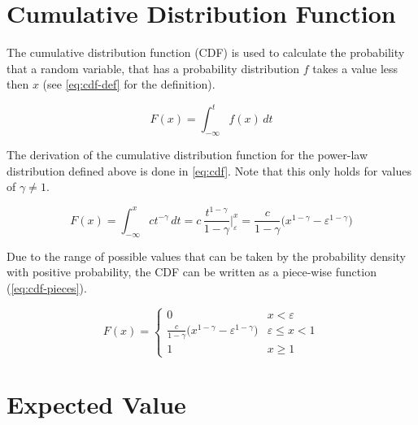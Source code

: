 

\section{Cumulative Distribution Function}
\label{sec:cdf}

The cumulative distribution function (CDF) is used to calculate the probability that a random variable, that has a probability distribution \(f\) takes a value less then \(x\) (see \autoref{eq:cdf-def} for the definition).

\begin{equation}
	F(x) = \int_{-\infty}^{t} f(x) \, dt
	\label{eq:cdf-def}
\end{equation}

The derivation of the cumulative distribution function for the power-law distribution defined above is done in \autoref{eq:cdf}.
Note that this only holds for values of \(\gamma \neq 1\).

\begin{equation}
	F(x) = \int_{-\infty}^{x} ct^{-\gamma} \, dt = c \, \frac{t^{1-\gamma}}{1-\gamma}  \bigg |_{\varepsilon}^{x} = \frac{c}{1-\gamma} \Big( x^{1 - \gamma} - \varepsilon^{1 - \gamma} \Big)
	\label{eq:cdf}
\end{equation}

Due to the range of possible values that can be taken by the probability density with positive probability, the CDF can be written as a piece-wise function (\autoref{eq:cdf-pieces}).

\begin{equation}
	F(x) =
	\begin{cases}
		0                                                                        & x < \varepsilon        \\
		\frac{c}{1-\gamma} \Big( x^{1 - \gamma} - \varepsilon^{1 - \gamma} \Big) & \varepsilon \leq x < 1 \\
		1                                                                        & x \geq 1
	\end{cases}
	\label{eq:cdf-pieces}
\end{equation}




\section{Expected Value}
\label{sec:expected-value}

